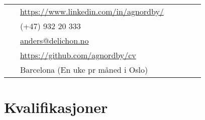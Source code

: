 \documentclass[10pt]{article} %
\begin{document}
\begin{paracol}{2}

\parbox[top][0.12\textheight][c]{\linewidth}{ %
	\vspace{-0.04\textheight} %
	\colorbox{shade}{ %
		\begin{supertabular}{p{0.05\linewidth}|p{0.775\linewidth}} %
			\raisebox{-1pt}{\faLinkedinSquare} & \href{https://www.linkedin.com/in/agnordby/}{https://www.linkedin.com/in/agnordby/} \\ %
			\raisebox{-1pt}{\faPhone} & (+47) 932 20 333 \\ %
			\raisebox{0pt}{\small\faEnvelope} & \href{mailto:anders@delichon.no}{anders@delichon.no} \\ %
			\raisebox{-1pt}{\faGithub} & \href{https://https://github.com/agnordby/cv}{https://github.com/agnordby/cv} \\ %
			\raisebox{-1pt}{\faHome} & Barcelona (En uke pr måned i Oslo) \\ %
		\end{supertabular}
	}
}


\section{Kvalifikasjoner}


\end{paracol}
\end{document}
